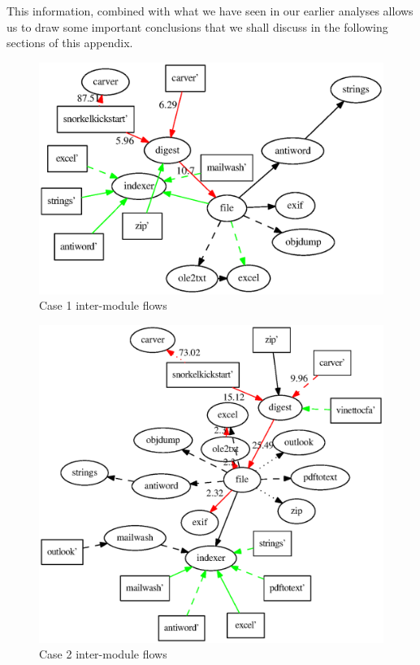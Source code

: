 This information, combined with what we have seen in our earlier analyses allows us to draw some important conclusions that we shall discuss in the following sections of this appendix.
\begin{figure}
  \centering
  \includegraphics[width=130mm]{ocfa/step5/stripped1_modules.eps}
  \caption{Case 1 inter-module flows}
  \label{fig:Case1Modules}
\end{figure}
\begin{figure}
  \centering
  \includegraphics[width=130mm]{ocfa/step5/stripped2_modules.eps}
  \caption{Case 2 inter-module flows}
  \label{fig:Case2Modules}
\end{figure}
